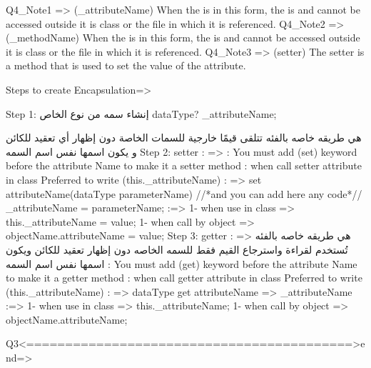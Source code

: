     Q4_Note1 => (_attributeName) When the \attribute is in this form, the \attribute is \private and cannot be accessed outside it is class or the file in which it is referenced.
    Q4_Note2 => (_methodName) When the \method is in this form, the \method is \private and cannot be accessed outside it is class or the file in which it is referenced.
    Q4_Note3 => (setter) The setter is a method that is used to set the value of the attribute.

    Steps to create Encapsulation=>{
        Step 1: إنشاء سمه من نوع الخاص
             dataType? _attributeName;
        
             هي طريقه خاصه بالفئه تتلقى قيمًا خارجية للسمات الخاصة دون إظهار أي تعقيد للكائن و يكون اسمها نفس اسم السمه 
             Step 2: setter { 
                    : => 
                    \note\1: You must add (set) keyword before the attribute Name to make it a setter method
                    \note\2: when call setter attribute in class Preferred to write (this._attributeName) 
                    \code : =>{
                        set attributeName(dataType parameterName){
                            //*and you can add here any code*//
                            _attributeName = parameterName;
                        }
                    }
                    \how\use :=> {
                        1- when use in class => this._attributeName = value;
                        1- when call by object => objectName.attributeName = value;
                    }
            }   
            Step 3: getter { 
                    : =>
 هي طريقه خاصه بالفئه تُستخدم لقراءة واسترجاع القيم فقط للسمه الخاصه دون إظهار تعقيد للكائن ويكون اسمها نفس اسم السمه 
                    \note\1: You must add (get) keyword before the attribute Name to make it a getter method
                    \note\2: when call getter attribute in class Preferred to write (this._attributeName) 
                    \code : =>{
                        dataType get attributeName => _attributeName
                    }
                    \how\use :=> {
                        1- when use in class => this._attributeName;
                        1- when call by object => objectName.attributeName;
                    }
            }  
    }
                     Q3<==========================================>end=>
